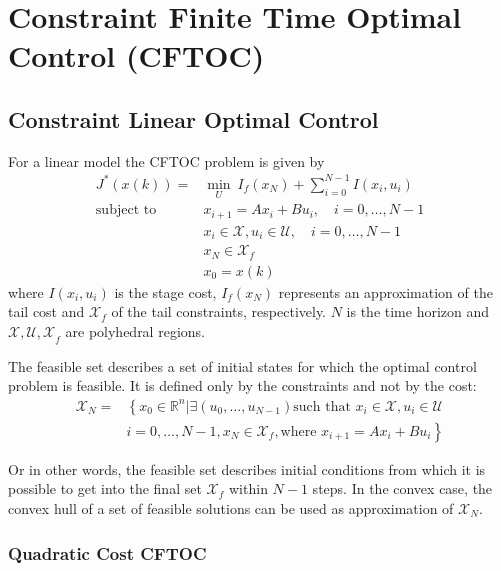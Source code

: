 \section{Constraint Finite Time Optimal Control (CFTOC)}

\subsection{Constraint Linear Optimal Control}

For a linear model the CFTOC problem is given by
\begin{align*}
    J^*(x(k)) =            & \min_U \: I_f(x_N) + \sum_{i=0}^{N-1}I(x_i,u_i)                    \\
    \text{subject to}\quad & x_{i+1} = Ax_i +Bu_i, \quad i = 0, \ldots, N-1                     \\
                           & x_i \in \mathcal{X}, u_i \in \mathcal{U}, \quad i = 0, \ldots, N-1 \\
                           & x_N \in \mathcal{X}_f                                              \\
                           & x_0 = x(k)
\end{align*}
where $I(x_i,u_i)$ is the stage cost, $I_f(x_N)$ represents an approximation of the tail cost and $\mathcal{X}_f$ of the tail constraints, respectively. $N$ is the time horizon and $\mathcal{X,U,X}_f$ are polyhedral regions.

\newpar{}

The feasible set describes a set of initial states for which the optimal control problem is feasible. It is defined only by the constraints and not by the cost:
\begin{align*}
    \mathcal{X}_N = & \left\{ x_0 \in \mathbb{R}^n | \exists\left(u_0, \ldots, u_{N-1}\right) \text{such that } x_i\in\mathcal{X}, u_i\in\mathcal{U} \right. \\
                    & \left.i=0,\ldots, N-1, x_N\in\mathcal{X}_f, \text{where } x_{i+1}=Ax_i + Bu_i\right\}
\end{align*}

Or in other words, the feasible set describes initial conditions from which it is possible to get into the final set $\mathcal{X}_f$ within $N-1$ steps.
\newpar{}
In the convex case, the convex hull of a set of feasible solutions can be used as approximation of $\mathcal{X}_N$.

\subsubsection{Quadratic Cost CFTOC}

